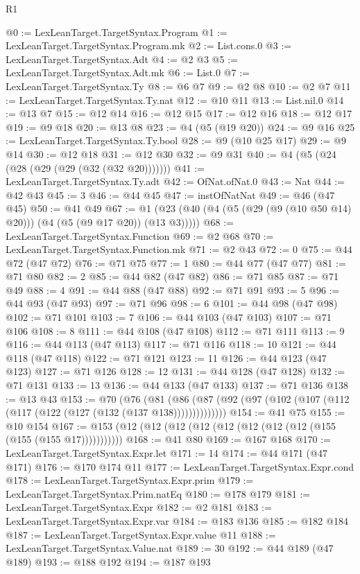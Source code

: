 \begin{lexlean}{R1}
\begin{coremodule}
@0 := LexLeanTarget.TargetSyntax.Program
@1 := LexLeanTarget.TargetSyntax.Program.mk
@2 := List.cons.{0}
@3 := LexLeanTarget.TargetSyntax.Adt
@4 := @2 @3
@5 := LexLeanTarget.TargetSyntax.Adt.mk
@6 := List.{0}
@7 := LexLeanTarget.TargetSyntax.Ty
@8 := @6 @7
@9 := @2 @8
@10 := @2 @7
@11 := LexLeanTarget.TargetSyntax.Ty.nat
@12 := @10 @11
@13 := List.nil.{0}
@14 := @13 @7
@15 := @12 @14
@16 := @12 @15
@17 := @12 @16
@18 := @12 @17
@19 := @9 @18
@20 := @13 @8
@23 := @4 (@5 (@19 @20))
@24 := @9 @16
@25 := LexLeanTarget.TargetSyntax.Ty.bool
@28 := @9 (@10 @25 @17)
@29 := @9 @14
@30 := @12 @18
@31 := @12 @30
@32 := @9 @31
@40 := @4 (@5 (@24 (@28 (@29 (@29 (@32 (@32 @20)))))))
@41 := LexLeanTarget.TargetSyntax.Ty.adt
@42 := OfNat.ofNat.{0}
@43 := Nat
@44 := @42 @43
@45 := 3
@46 := @44 @45
@47 := instOfNatNat
@49 := @46 (@47 @45)
@50 := @41 @49
@67 := @1 (@23 (@40 (@4 (@5 (@29 (@9 (@10 @50 @14) @20))) (@4 (@5 (@9 @17 @20)) (@13 @3)))))
@68 := LexLeanTarget.TargetSyntax.Function
@69 := @2 @68
@70 := LexLeanTarget.TargetSyntax.Function.mk
@71 := @2 @43
@72 := 0
@75 := @44 @72 (@47 @72)
@76 := @71 @75
@77 := 1
@80 := @44 @77 (@47 @77)
@81 := @71 @80
@82 := 2
@85 := @44 @82 (@47 @82)
@86 := @71 @85
@87 := @71 @49
@88 := 4
@91 := @44 @88 (@47 @88)
@92 := @71 @91
@93 := 5
@96 := @44 @93 (@47 @93)
@97 := @71 @96
@98 := 6
@101 := @44 @98 (@47 @98)
@102 := @71 @101
@103 := 7
@106 := @44 @103 (@47 @103)
@107 := @71 @106
@108 := 8
@111 := @44 @108 (@47 @108)
@112 := @71 @111
@113 := 9
@116 := @44 @113 (@47 @113)
@117 := @71 @116
@118 := 10
@121 := @44 @118 (@47 @118)
@122 := @71 @121
@123 := 11
@126 := @44 @123 (@47 @123)
@127 := @71 @126
@128 := 12
@131 := @44 @128 (@47 @128)
@132 := @71 @131
@133 := 13
@136 := @44 @133 (@47 @133)
@137 := @71 @136
@138 := @13 @43
@153 := @70
    (@76 (@81 (@86 (@87 (@92 (@97 (@102 (@107 (@112 (@117 (@122 (@127 (@132 (@137 @138))))))))))))))
@154 := @41 @75
@155 := @10 @154
@167 := @153 (@12 (@12 (@12 (@12 (@12 (@12 (@12 (@12 (@155 (@155 (@155 @17)))))))))))
@168 := @41 @80
@169 := @167 @168
@170 := LexLeanTarget.TargetSyntax.Expr.let
@171 := 14
@174 := @44 @171 (@47 @171)
@176 := @170 @174 @11
@177 := LexLeanTarget.TargetSyntax.Expr.cond
@178 := LexLeanTarget.TargetSyntax.Expr.prim
@179 := LexLeanTarget.TargetSyntax.Prim.natEq
@180 := @178 @179
@181 := LexLeanTarget.TargetSyntax.Expr
@182 := @2 @181
@183 := LexLeanTarget.TargetSyntax.Expr.var
@184 := @183 @136
@185 := @182 @184
@187 := LexLeanTarget.TargetSyntax.Expr.value @11
@188 := LexLeanTarget.TargetSyntax.Value.nat
@189 := 30
@192 := @44 @189 (@47 @189)
@193 := @188 @192
@194 := @187 @193

\end{coremodule}
\end{lexlean}
